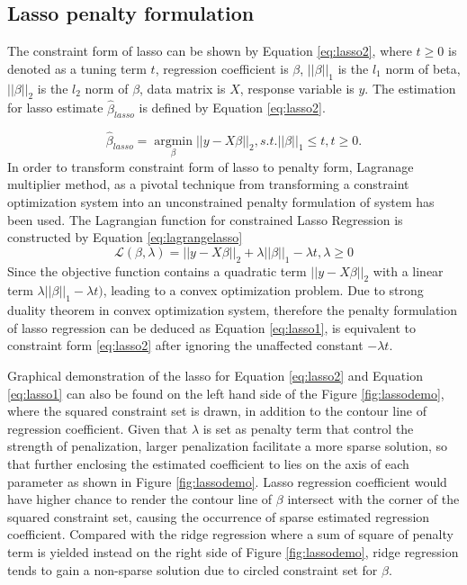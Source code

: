 \subsection{Lasso penalty formulation}
The constraint form of lasso can be shown by Equation \ref{eq:lasso2}, where $t \geq 0$ is denoted as a tuning term $t$, regression coefficient is $\beta$, $||\beta||_1$ is the $l_1$ norm of beta, $||\beta||_2$ is the $l_2$ norm of $\beta$, data matrix is $X$, response variable is $y$. The estimation for lasso estimate $\hat{\beta}_{lasso}$ is defined by Equation \ref{eq:lasso2}. 

\begin{equation}
	\label{eq:lasso2}
	\hat{\beta}_{lasso} = \underset{\beta}{\operatorname{argmin}} ||y-X\beta||_2, s.t. ||\beta||_1 \leq t, t \geq 0.
\end{equation}
In order to transform constraint form of lasso to penalty form, Lagranage multiplier method, as a pivotal technique from transforming a constraint optimization system into an unconstrained penalty formulation of system has been used. The Lagrangian function for constrained Lasso Regression is constructed by Equation \ref{eq:lagrangelasso}
\begin{equation}
	\label{eq:lagrangelasso}
	\mathcal{L}(\beta,\lambda) =  ||y-X\beta||_2 + \lambda||\beta||_1 - \lambda t, \lambda \geq 0
\end{equation}
Since the objective function contains a quadratic term $||y-X\beta||_2$ with a linear term $\lambda||\beta||_1 - \lambda t)$, leading to a convex optimization problem. Due to strong duality theorem in convex optimization system, therefore the penalty formulation of lasso regression can be deduced as Equation \ref{eq:lasso1}, is equivalent to constraint form \ref{eq:lasso2} after ignoring the unaffected constant $-\lambda t$.


Graphical demonstration of the lasso for Equation \ref{eq:lasso2} and Equation \ref{eq:lasso1} can also be found on the left hand side of the Figure \ref{fig:lassodemo}, where the squared constraint set is drawn, in addition to the contour line of regression coefficient. Given that $\lambda$ is set as penalty term that control the strength of penalization, larger penalization facilitate a more sparse solution, so that further enclosing the estimated coefficient to lies on the axis of each parameter as shown in Figure \ref{fig:lassodemo}. Lasso regression coefficient would have higher chance to render the contour line of $\beta$ intersect with the corner of the squared constraint set, causing the occurrence of sparse estimated regression coefficient. Compared with the ridge regression where a sum of square of penalty term is yielded instead on the right side of Figure \ref{fig:lassodemo}, ridge regression tends to gain a non-sparse solution due to circled constraint set for $\beta$.

